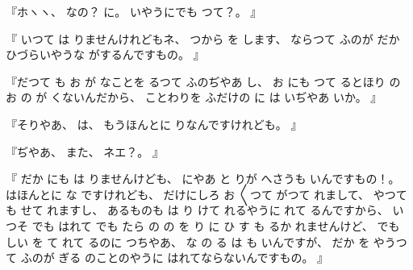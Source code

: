 『ホヽヽ、
%
なの？
に。
%
いやうにでも
つて？。
』

『
いつて
は
りませんけれどもネ、
%
つから
を
します、
%
ならつて
ふのが
だか
ひづらいやうな
がするんですもの。
』

『だつて
も
お
が
なことを
るつて
ふのぢやあ
し、
%
お
にも
つて
るとほり
の
お
の
が
くないんだから、
%
ことわりを
ふだけの
に
は
いぢやあ
いか。
』

『そりやあ、
%
は、
%
もうほんとに
りなんですけれども。
』

『ぢやあ、
%
また、
%
ネエ？。
』

『
だか
にも
は
りませんけども、
%
にやあ
と
りが
へさうも
いんですもの！。
%
はほんとに
な
ですけれども、
%
だけにしろ
お
〳〵つて
がつて
れまして、
%
やつて
も
せて
れますし、
%
あるものも
は
り
けて
れるやうに
れて
るんですから、
%
いつそ
でも
はれて
でも
たら
の
の
を
り
に
ひ
す
も
るか
れませんけど、
%
でも
しい
を
て
れて
るのに
つちやあ、
%
な
の
る
は
も
いんですが、
%
だか
を
やうつて
ふのが
ぎる
のことのやうに
はれてならないんですもの。
』

